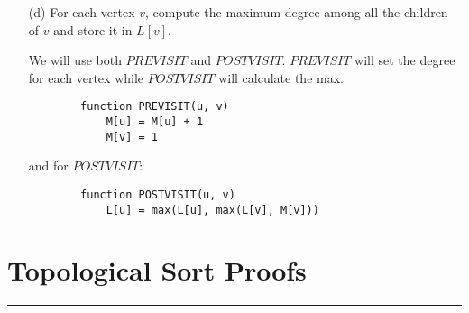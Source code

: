 \documentclass{article}
\begin{document}
\begin{itemize}
        \item [(d)] For each vertex $v$, compute the maximum degree among all the children of $v$ and store it in $L[v]$. 
            \begin{answer}
                We will use both $PREVISIT$ and $POSTVISIT$. $PREVISIT$ will set the degree for each vertex while $POSTVISIT$ will calculate the max.
                    \begin{verbatim}
        function PREVISIT(u, v)
            M[u] = M[u] + 1
            M[v] = 1
                    \end{verbatim}
                and for $POSTVISIT$:
                    \begin{verbatim}
        function POSTVISIT(u, v)
            L[u] = max(L[u], max(L[v], M[v]))
                    \end{verbatim}
            \end{answer}
    \end{itemize}

\newpage
\section*{Topological Sort Proofs}
\hrule
\end{document}
